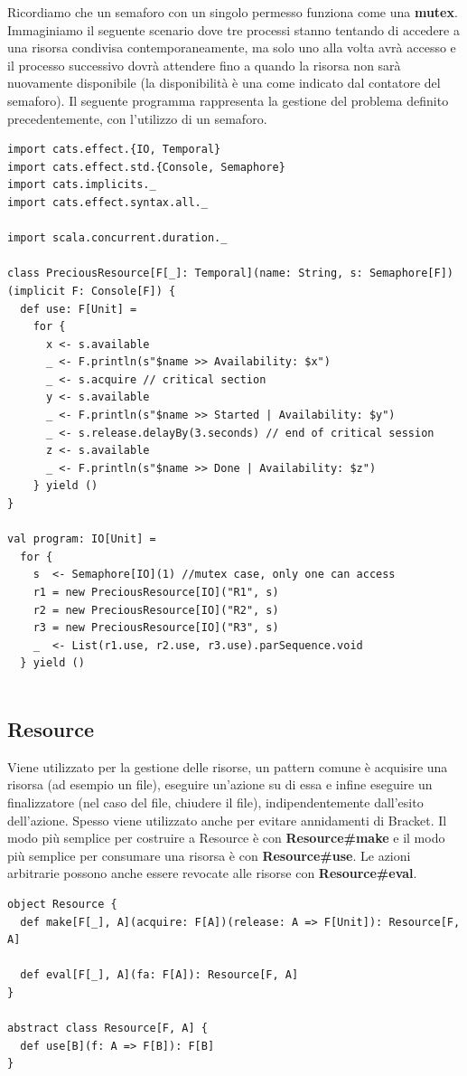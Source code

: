 \noindent Ricordiamo che un semaforo con un singolo permesso funziona
come una \textbf{mutex}. Immaginiamo il seguente scenario dove tre processi stanno tentando di accedere a una risorsa condivisa contemporaneamente, ma solo uno alla volta avrà accesso e il processo successivo dovrà attendere fino a quando la risorsa non sarà nuovamente disponibile (la disponibilità è una come indicato dal contatore del semaforo). Il seguente programma rappresenta la gestione del problema definito precedentemente, con l'utilizzo di un semaforo.

\begin{verbatim}
import cats.effect.{IO, Temporal}
import cats.effect.std.{Console, Semaphore}
import cats.implicits._
import cats.effect.syntax.all._

import scala.concurrent.duration._

class PreciousResource[F[_]: Temporal](name: String, s: Semaphore[F])
(implicit F: Console[F]) {
  def use: F[Unit] =
    for {
      x <- s.available
      _ <- F.println(s"$name >> Availability: $x")
      _ <- s.acquire // critical section
      y <- s.available
      _ <- F.println(s"$name >> Started | Availability: $y")
      _ <- s.release.delayBy(3.seconds) // end of critical session
      z <- s.available
      _ <- F.println(s"$name >> Done | Availability: $z")
    } yield ()
}

val program: IO[Unit] =
  for {
    s  <- Semaphore[IO](1) //mutex case, only one can access
    r1 = new PreciousResource[IO]("R1", s)
    r2 = new PreciousResource[IO]("R2", s)
    r3 = new PreciousResource[IO]("R3", s)
    _  <- List(r1.use, r2.use, r3.use).parSequence.void
  } yield ()
    
\end{verbatim}

\subsection{Resource}
Viene utilizzato per la gestione delle risorse, un pattern comune è acquisire una risorsa
(ad esempio un file), eseguire un’azione su di essa e infine eseguire un finalizzatore (nel
caso del file, chiudere il file), indipendentemente dall’esito dell’azione. Spesso viene utilizzato anche per evitare annidamenti di Bracket. Il modo più semplice per costruire a Resource è con \textbf{Resource\#make} e il modo più semplice per consumare una risorsa è con \textbf{Resource\#use}. Le azioni arbitrarie possono anche essere revocate alle risorse con \textbf{Resource\#eval}.
\begin{verbatim}
object Resource {
  def make[F[_], A](acquire: F[A])(release: A => F[Unit]): Resource[F, A]

  def eval[F[_], A](fa: F[A]): Resource[F, A]
}

abstract class Resource[F, A] {
  def use[B](f: A => F[B]): F[B]
}
\end{verbatim}


